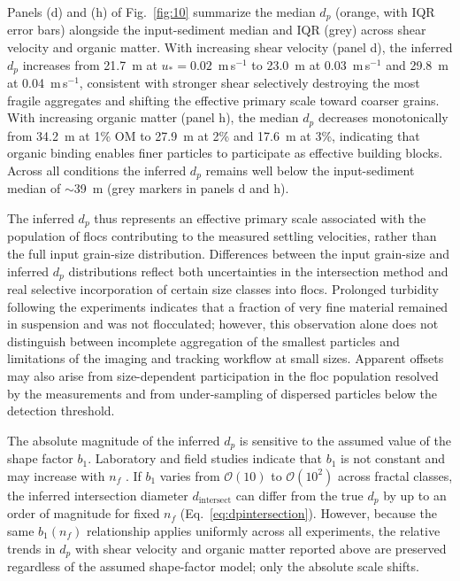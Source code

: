 \documentclass{agujournal2019}
\begin{document}
Panels (d) and (h) of Fig.~\ref{fig:10} summarize the median $d_p$ (orange, with IQR error bars) alongside the input-sediment median and IQR (grey) across shear velocity and organic matter. With increasing shear velocity (panel d), the inferred $d_p$ increases from 21.7~\textmu m at $u_* = 0.02$~m\,s$^{-1}$ to 23.0~\textmu m at 0.03~m\,s$^{-1}$ and 29.8~\textmu m at 0.04~m\,s$^{-1}$, consistent with stronger shear selectively destroying the most fragile aggregates and shifting the effective primary scale toward coarser grains. With increasing organic matter (panel h), the median $d_p$ decreases monotonically from 34.2~\textmu m at 1\% OM to 27.9~\textmu m at 2\% and 17.6~\textmu m at 3\%, indicating that organic binding enables finer particles to participate as effective building blocks. Across all conditions the inferred $d_p$ remains well below the input-sediment median of $\sim$39~\textmu m (grey markers in panels d and h). 

The inferred $d_p$ thus represents an effective primary scale associated with the population of flocs contributing to the measured settling velocities, rather than the full input grain-size distribution. Differences between the input grain-size and inferred $d_p$ distributions reflect both uncertainties in the intersection method and real selective incorporation of certain size classes into flocs. Prolonged turbidity following the experiments indicates that a fraction of very fine material remained in suspension and was not flocculated; however, this observation alone does not distinguish between incomplete aggregation of the smallest particles and limitations of the imaging and tracking workflow at small sizes. Apparent offsets may also arise from size-dependent participation in the floc population resolved by the measurements and from under-sampling of dispersed particles below the detection threshold.

The absolute magnitude of the inferred $d_p$ is sensitive to the assumed value of the shape factor $b_1$. Laboratory and field studies indicate that $b_1$ is not constant and may increase with $n_f$ \cite{strom2011explicit}. If $b_1$ varies from $\mathcal{O}(10)$ to $\mathcal{O}(10^2)$ across fractal classes, the inferred intersection diameter $d_{\mathrm{intersect}}$ can differ from the true $d_p$ by up to an order of magnitude for fixed $n_f$ (Eq.~\eqref{eq:dpintersection}). However, because the same $b_1(n_f)$ relationship applies uniformly across all experiments, the relative trends in $d_p$ with shear velocity and organic matter reported above are preserved regardless of the assumed shape-factor model; only the absolute scale shifts. 
\end{document}
